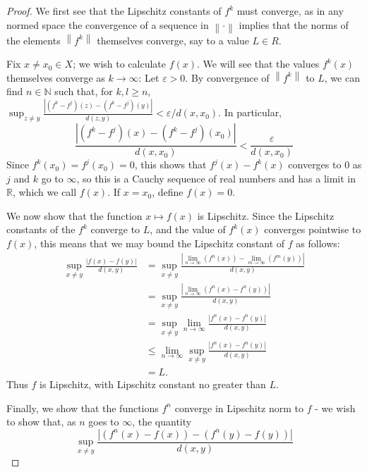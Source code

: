 \documentclass[12pt]{article}
\newcommand{\N}{\mathbb{N}}
\newcommand{\R}{\mathbb{R}}
\theoremstyle{definition}
\begin{document}
\begin{proof}
    \par We first see that the Lipschitz constants of $f^k$ must converge, as in any normed space the convergence of a sequence in $\left \lVert { \cdot } \right \lVert $ implies that the norms of the elements $\left \lVert { f^k } \right \lVert $ themselves converge, say to a value $L \in R$. 
    \par Fix $x \neq x_0 \in X$; we wish to calculate $f(x)$. We will see that the values $f^k(x)$ themselves converge as $k \to \infty$: Let $\varepsilon > 0$. By convergence of $\left \lVert { f^k } \right \lVert $ to $L$, we can find $n \in \N$ such that, for $k, l \geq n$, $ \sup_{z \neq y}\frac{\left \lvert { (f^k - f^j)(z) - (f^k - f^j)(y) } \right \lvert }{d(z,y)} < \varepsilon/d(x,x_0)$. In particular, 
    \[\frac{\left \lvert { (f^k - f^j)(x) - (f^k - f^j)(x_0) } \right \lvert }{d(x,x_0)} < \frac{\varepsilon}{d(x,x_0)}\]
    Since $f^k(x_0) = f^j(x_0) = 0$, this shows that $f^j(x) - f^k(x)$ converges to $0$ as $j$ and $k$ go to $\infty$, so this is a Cauchy sequence of real numbers and has a limit in $\R$, which we call $f(x)$. If $x = x_0$, define $f(x) = 0$.
    \par We now show that the function $x \mapsto f(x)$ is Lipschitz. Since the Lipschitz constants of the $f^k$ converge to $L$, and the value of $f^k(x)$ converges pointwise to $f(x)$, this means that we may bound the Lipschitz constant of $f$ as follows:
    \begin{align*}
	    \sup_{x \neq y}\frac{\left \lvert { f(x) - f(y) } \right \lvert }{d(x,y)} &= \sup_{x \neq y}\frac{\left \lvert { \lim_{n \to \infty}(f^n(x)) - \lim_{m \to \infty}(f^m(y)) } \right \lvert }{d(x,y)}\\
	    &= \sup_{x \neq y} \frac{\left \lvert { \lim_{n \to \infty}(f^n(x) - f^n(y)) } \right \lvert }{d(x,y)}\\
	    &= \sup_{x \neq y}\lim_{n \to \infty}\frac{\left \lvert { f^n(x) - f^n(y) } \right \lvert }{d(x,y)}\\
	    &\leq \lim_{n \to \infty} \sup_{x \neq y} \frac{\left \lvert { f^n(x) - f^n(y) } \right \lvert }{d(x,y)}\\
	    &= L.
    \end{align*}
    Thus $f$ is Lipschitz, with Lipschitz constant no greater than $L$. 
    \par Finally, we show that the functions $f^n$ converge in Lipschitz norm to $f$ - we wish to show that, as $n$ goes to $\infty$, the quantity
    \[\sup_{x \neq y} \frac{\left \lvert { (f^n(x) - f(x)) - (f^n(y) - f(y)) } \right \lvert }{d(x, y)} \]

\end{proof}
\end{document}
